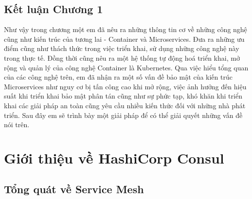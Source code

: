 \documentclass[14pt,a4paper]{report}
\begin{document}
	\newpage				
	\section*{Kết luận Chương 1}
	\hspace{1cm}Như vậy trong chương một em đã nêu ra những thông tin cơ về những công nghệ cũng như kiến trúc của tương lai - Container và Microservices. Đưa ra những ưu điểm cũng như thách thức trong việc triển khai, sử dụng những công nghệ này trong thực tế. Đồng thời cũng nêu ra một hệ thống tự động hoá triển khai, mở rộng và quản lý của công nghệ Container là Kubernetes. Qua việc hiểu tổng quan của các công nghệ trên, em đã nhận ra một số vấn đề bảo mật của kiến trúc Microservices như nguy cơ bị tấn công cao khi mở rộng, việc ảnh hưởng đến hiệu suất khi triển khai bảo mật phân tán cũng như sự phức tạp, khó khăn khi triển khai các giải pháp an toàn cũng yêu cầu nhiều kiến thức đối với những nhà phát triển. Sau đây em sẽ trình bày một giải pháp để có thể giải quyết những vấn đề nói trên.
	
	\chapter{Giới thiệu về HashiCorp Consul}
	
	\section{Tổng quát về Service Mesh}
	
\end{document}
